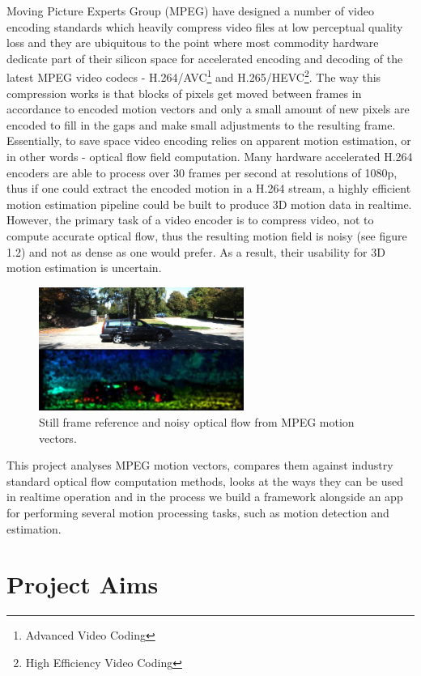 \documentclass[11pt,english]{report}
\begin{document}
Moving Picture Experts Group (MPEG) have designed a number of video encoding standards which heavily compress video files at low perceptual quality loss and they are ubiquitous to the point where most commodity hardware dedicate part of their silicon space for accelerated encoding and decoding of the latest MPEG video codecs - H.264/AVC\footnote{Advanced Video Coding}\cite{h264} and H.265/HEVC\footnote{High Efficiency Video Coding}\cite{h265}. The way this compression works is that blocks of pixels get moved between frames in accordance to encoded motion vectors and only a small amount of new pixels are encoded to fill in the gaps and make small adjustments to the resulting frame. Essentially, to save space video encoding relies on apparent motion estimation, or in other words - optical flow field computation. Many hardware accelerated H.264 encoders are able to process over 30 frames per second at resolutions of 1080p, thus if one could extract the encoded motion in a H.264 stream, a highly efficient motion estimation pipeline could be built to produce 3D motion data in realtime. However, the primary task of a video encoder is to compress video, not to compute accurate optical flow, thus the resulting motion field is noisy\cite{1334181} (see figure 1.2) and not as dense as one would prefer. As a result, their usability for 3D motion estimation is uncertain.

\begin{figure}[!ht]
	\centering
	\includegraphics[width=190pt]{docs/report/mpeg-mvecs.jpg}
	\caption{\centering Still frame reference and noisy optical flow from MPEG motion vectors.}
\end{figure}

This project analyses MPEG motion vectors, compares them against industry standard optical flow computation methods, looks at the ways they can be used in realtime operation and in the process we build a framework alongside an app for performing several motion processing tasks, such as motion detection and estimation.

\section{Project Aims}
\end{document}
